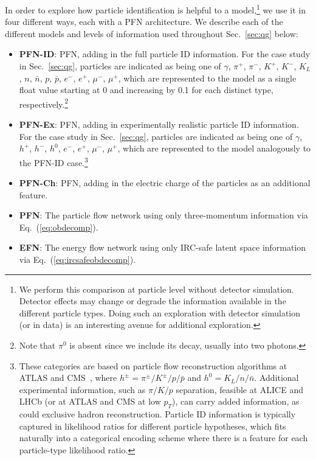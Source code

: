 \documentclass[letterpaper,11pt]{article}
\DeclareRobustCommand{\Sec}[1]{Sec.~\ref{#1}}
\DeclareRobustCommand{\Eq}[1]{Eq.~(\ref{#1})}
\begin{document}
In order to explore how particle identification is helpful to a model,\footnote{We perform this comparison at particle level without detector simulation. Detector effects may change or degrade the information available in the different particle types. Doing such an exploration with detector simulation (or in data) is an interesting avenue for additional exploration.} we use it in four different ways, each with a PFN architecture.
%
We describe each of the different models and levels of information used throughout \Sec{sec:qg} below:
%
\begin{itemize}
%
\item{\bf PFN-ID}: PFN, adding in the full particle ID information. 
%
For the case study in \Sec{sec:qg}, particles are indicated as being one of $\gamma$, $\pi^+$, $\pi^-$, $K^+$, $K^-$, $K_L$, $n$, $\bar n$, $p$, $\bar p$, $e^-$, $e^+$, $\mu^-$, $\mu^+$, which are represented to the model as a single float value starting at 0 and increasing by 0.1 for each distinct type, respectively.\footnote{Note that $\pi^0$ is absent since we include its decay, usually into two photons.}
%
\item{\bf PFN-Ex}: PFN, adding in experimentally realistic particle ID information. 
%
For the case study in \Sec{sec:qg}, particles are indicated as being one of $\gamma$, $h^+$, $h^-$, $h^0$, $e^-$, $e^+$, $\mu^-$, $\mu^+$, which are represented to the model analogously to the PFN-ID case.\footnote{These categories are based on particle flow reconstruction algorithms at ATLAS and CMS~\cite{Beaudette:2014cea,Sirunyan:2017ulk,Aaboud:2017aca}, where $h^\pm = \pi^\pm/K^\pm/p/\bar{p}$ and $h^0 = K_L/n/\bar{n}$. Additional experimental information, such as $\pi/K/p$ separation, feasible at ALICE and LHCb (or at ATLAS and CMS at low $p_T$), can carry added information, as could exclusive hadron reconstruction. Particle ID information is typically captured in likelihood ratios for different particle hypotheses, which fits naturally into a categorical encoding scheme where there is a feature for each particle-type likelihood ratio.
}
\item{\bf PFN-Ch}: PFN, adding in the electric charge of the particles as an additional feature.
%
\item{\bf PFN}: The particle flow network using only three-momentum information via \Eq{eq:obdecomp}.
%
\item{\bf EFN}: The energy flow network using only IRC-safe latent space information via \Eq{eq:ircsafeobdecomp}.
%
\end{itemize}
\end{document}
